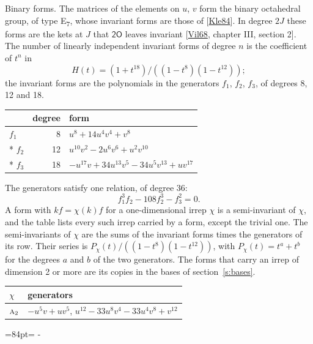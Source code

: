 \documentclass[10pt,a4paper]{article}
\makeatletter
\renewcommand\paragraph{\@startsection{paragraph}{4}{\z@}{1.5ex plus .5ex minus .2ex}{-1em}%
  {\normalfont\small\sffamily\bfseries\color{parttitle}}}
\newcommand{\needspace}[1]{\par\penalty-100\begingroup\dimen0=#1\relax\dimen2=\pagegoal
  \advance\dimen2-\pagetotal\ifdim\dimen0>\dimen2\relax\ifdim\dimen2>0pt\vfil\break\fi\fi
  \endgroup}
\numberwithin{equation}{section}
\newcommand{\grp}[1]{\mathsf{#1}}
\newcommand{\irr}[1]{\text{\normalfont\scshape #1}}
\makeatother
\begin{document}
\paragraph{Binary forms.}
The matrices of the elements on $u$, $v$ form the binary octahedral group, of type E\textsubscript{7}, whose invariant forms are those of [\href{../../../REFERENCES.pdf\#ref.Kle84}{Kle84}]. In degree $2J$ these forms are the kets at $J$ that $\grp{2O}$ leaves invariant [\href{../../../REFERENCES.pdf\#ref.Vil68}{Vil68}, chapter III, section 2]. \label{n:head.degree}\label{n:head.form}The number of linearly independent invariant forms of degree $n$ is the coefficient of $t^n$ in
\begin{equation}\label{e:molien}H(t) = (1 + t^{18})/((1-t^{8})(1-t^{12}));\end{equation}
the invariant forms are the polynomials in the generators $f_1$, $f_2$, $f_3$, of degrees 8, 12 and 18.
{\small\begin{longtable}{@{}lrl@{}}\toprule
& degree & form\\\midrule\endhead
\bottomrule\endfoot\endlastfoot
$f_{1}$ & 8 & $u^{8} + 14u^{4}v^{4} + v^{8}$\\*
$f_{2}$ & 12 & $u^{10}v^{2} - 2u^{6}v^{6} + u^{2}v^{10}$\\*
$f_{3}$ & 18 & $-u^{17}v + 34u^{13}v^{5} - 34u^{5}v^{13} + uv^{17}$\\
\bottomrule\end{longtable}}
The generators satisfy one relation, of degree 36:
\begin{equation}\label{e:relation}f_{1}^{3}f_{2} - 108f_{2}^{3} - f_{3}^{2} = 0.\end{equation}
A form with $k f = \chi(k) f$ for a one-dimensional irrep $\chi$ is a semi-invariant of $\chi$, and the table lists every such irrep carried by a form, except the trivial one. \label{n:head.generators}The semi-invariants of $\chi$ are the sums of the invariant forms times the generators of its row. Their series is $P_\chi(t)/((1-t^{8})(1-t^{12}))$, with $P_\chi(t) = t^{a} + t^{b}$ for the degrees $a$ and $b$ of the two generators. The forms that carry an irrep of dimension 2 or more are its copies in the bases of section~\ref{s:bases}.
{\small\begin{longtable}{@{}ll@{}}\toprule
$\chi$ & generators\\\midrule\endhead
\bottomrule\endfoot\endlastfoot
$\irr{a}_{2}$ & $-u^{5}v + uv^{5}$, $u^{12} - 33u^{8}v^{4} - 33u^{4}v^{8} + v^{12}$\\
\bottomrule\end{longtable}}
\needspace{84pt}
\end{document}
